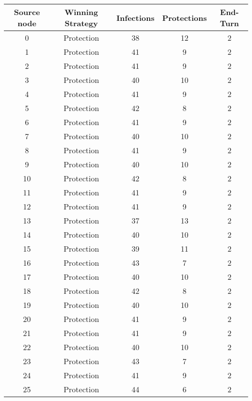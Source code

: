 \documentclass[results.tex]{subfiles}
\begin{document}
\begin{center}
  \begin{tabular}{| c || c | c | c | c |}
    \hline
    {\bfseries Source node} & {\bfseries Winning Strategy} & {\bfseries Infections} & {\bfseries Protections} & {\bfseries End-Turn} \\  %
    \hline\hline
    0 & Protection & 38 & 12 & 2 \\ 
    \hline
    1 & Protection & 41 & 9 & 2 \\ 
    \hline
    2 & Protection & 41 & 9 & 2 \\ 
    \hline
    3 & Protection & 40 & 10 & 2 \\ 
    \hline
    4 & Protection & 41 & 9 & 2 \\ 
    \hline
    5 & Protection & 42 & 8 & 2 \\ 
    \hline
    6 & Protection & 41 & 9 & 2 \\ 
    \hline
    7 & Protection & 40 & 10 & 2 \\ 
    \hline
    8 & Protection & 41 & 9 & 2 \\ 
    \hline
    9 & Protection & 40 & 10 & 2 \\ 
    \hline
    10 & Protection & 42 & 8 & 2 \\ 
    \hline
    11 & Protection & 41 & 9 & 2 \\ 
    \hline
    12 & Protection & 41 & 9 & 2 \\ 
    \hline
    13 & Protection & 37 & 13 & 2 \\ 
    \hline
    14 & Protection & 40 & 10 & 2 \\ 
    \hline
    15 & Protection & 39 & 11 & 2 \\ 
    \hline
    16 & Protection & 43 & 7 & 2 \\ 
    \hline
    17 & Protection & 40 & 10 & 2 \\ 
    \hline
    18 & Protection & 42 & 8 & 2 \\ 
    \hline
    19 & Protection & 40 & 10 & 2 \\ 
    \hline
    20 & Protection & 41 & 9 & 2 \\ 
    \hline
    21 & Protection & 41 & 9 & 2 \\ 
    \hline
    22 & Protection & 40 & 10 & 2 \\ 
    \hline
    23 & Protection & 43 & 7 & 2 \\ 
    \hline
    24 & Protection & 41 & 9 & 2 \\ 
    \hline
    25 & Protection & 44 & 6 & 2 \\ 

\end{tabular}
\end{center}
\end{document}
